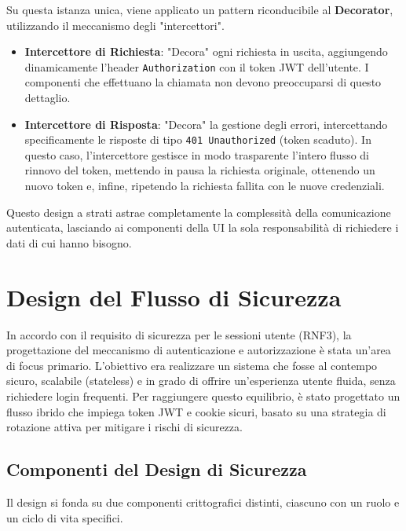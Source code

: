 \documentclass[12pt,a4paper,openright,twoside]{book}
\begin{document}
Su questa istanza unica, viene applicato un pattern riconducibile al \textbf{Decorator}, utilizzando il meccanismo degli "intercettori".
\begin{itemize}
    \item \textbf{Intercettore di Richiesta}: "Decora" ogni richiesta in uscita, aggiungendo dinamicamente l'header \texttt{Authorization} con il token JWT dell'utente. I componenti che effettuano la chiamata non devono preoccuparsi di questo dettaglio.
    \item \textbf{Intercettore di Risposta}: "Decora" la gestione degli errori, intercettando specificamente le risposte di tipo \texttt{401 Unauthorized} (token scaduto). In questo caso, l'intercettore gestisce in modo trasparente l'intero flusso di rinnovo del token, mettendo in pausa la richiesta originale, ottenendo un nuovo token e, infine, ripetendo la richiesta fallita con le nuove credenziali.
\end{itemize}
Questo design a strati astrae completamente la complessità della comunicazione autenticata, lasciando ai componenti della UI la sola responsabilità di richiedere i dati di cui hanno bisogno.

\section{Design del Flusso di Sicurezza}
\label{sec:design_security_flow}

In accordo con il requisito di sicurezza per le sessioni utente (RNF3), la progettazione del meccanismo di autenticazione e autorizzazione è stata un'area di focus primario. L'obiettivo era realizzare un sistema che fosse al contempo sicuro, scalabile (stateless) e in grado di offrire un'esperienza utente fluida, senza richiedere login frequenti. Per raggiungere questo equilibrio, è stato progettato un flusso ibrido che impiega token JWT e cookie sicuri, basato su una strategia di rotazione attiva per mitigare i rischi di sicurezza.

\subsection{Componenti del Design di Sicurezza}
Il design si fonda su due componenti crittografici distinti, ciascuno con un ruolo e un ciclo di vita specifici.
\end{document}
